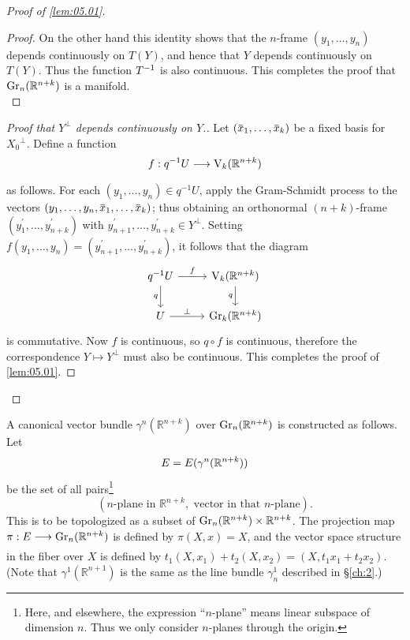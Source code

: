 \documentclass[../main]{subfiles}
\begin{document}
\begin{proof}[Proof of \ref{lem:05.01}]
\begin{proof}
On the other hand this identity shows that the $n$-frame $(y_1,\dots, y_n) $
depends continuously on $T(Y)$, and hence that $Y$ depends continuously
on $T(Y)$. Thus the function $T^{-1}$ is also continuous. This completes
the proof that $\operatorname{Gr}_n (\mathbb{R}^{n+k})$ is a manifold.\\
\end{proof}
\begin{proof}[Proof that $Y^\perp$ depends continuously on $Y$.]
Let $(\xoverline{x}_1,\dots,\xoverline{x}_k)$ be a fixed basis for $X_{0}{ }^{\perp}$. Define a function
\[f:q\inv U \varrightarrow{}\StiefelManifold_k(\mathbb{R}^{n+k})\]
as follows. For each $(y_{1}, \dots, y_{n}) \in q^{-1} U$, apply the Gram-Schmidt process to the vectors $(y_{1}, \dots, y_{n}, \xoverline{x}_{1}, \dots, \xoverline{x}_{k})$; thus obtaining an orthonormal $(n+k)$-frame $(y_{1}^{\prime}, \dots, y_{n+k}^{\prime})$ with $y_{n+1}^{\prime}, \dots, y_{n+k}^{\prime} \in Y^{\perp}$. Setting $f(y_{1}, \dots, y_{n})=(y_{n+1}^{\prime}, \dots, y_{n+k}^{\prime})$, it follows that the diagram
\[\begin{tikzcd}
	q\inv U \arrow[r, "f"] \arrow[d, "q"'] & \StiefelManifold_k(\mathbb{R}^{n+k}) \arrow[d, "q"'] \\
	U \arrow[r, "\perp"]                   & \grassmannian_{k}(\mathbb{R}^{n+k})                    
\end{tikzcd}\]
is commutative. Now $f$ is continuous, so $q \circ f$ is continuous, therefore the correspondence $Y \mapsto Y^{\perp}$ must also be continuous. This completes the proof of \ref{lem:05.01}.
\end{proof}
\end{proof}
A canonical vector bundle $\gamma^n(\mathbb{R}^{n+k})$ over $\operatorname{Gr}_n (\mathbb{R}^{n+k})$ is constructed
as follows. Let
\[E=E(\gamma^n(\mathbb{R}^{n+k}))\]
be the set of all pairs\footnote{Here, and elsewhere, the expression ``$n$-plane'' means linear subspace of
	dimension $n$. Thus we only consider $n$-planes through the origin.}
\[
 (\text {$n$-plane in } \mathbb{R}^{n+k}, \text { vector in that $n$-plane}). 
\]
This is to be topologized as a subset of $\operatorname{Gr}_n (\mathbb{R}^{n+k})\times \mathbb{R}^{n+k}$. The projection map $\pi:\total\varrightarrow{} \grassmannian_n (\mathbb{R}^{n+k})$ is defined by $\pi(X, x)=X$, and the vector space structure in the fiber over $X$ is defined by $t_{1}(X, x_{1})+t_{2}(X, x_{2})= (X, t_{1} x_{1}+t_{2} x_{2}) .$ (Note that $\gamma^{1}(\mathbb{R}^{n+1})$ is the same as the line bundle $\gamma_{n}^{1}$ described in \S\ref{ch:2}.)
\end{document}
